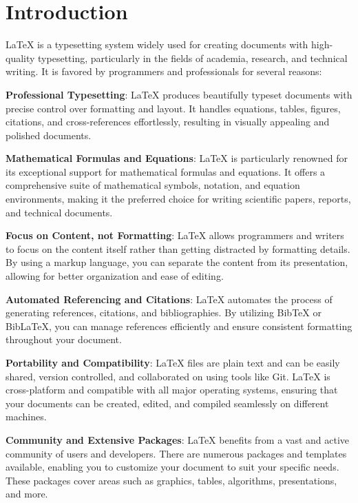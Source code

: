 \documentclass[12pt]{article}
\begin{document}
	
	
	\tableofcontents
	\clearpage
	
	
	\section{Introduction}
	
	LaTeX is a typesetting system widely used for creating documents with high-quality typesetting, particularly in the fields of academia, research, and technical writing. It is favored by programmers and professionals for several reasons:
	
    \textbf{Professional Typesetting}: LaTeX produces beautifully typeset documents with precise control over formatting and layout. It handles equations, tables, figures, citations, and cross-references effortlessly, resulting in visually appealing and polished documents.
	
	\textbf{Mathematical Formulas and Equations}: LaTeX is particularly renowned for its exceptional support for mathematical formulas and equations. It offers a comprehensive suite of mathematical symbols, notation, and equation environments, making it the preferred choice for writing scientific papers, reports, and technical documents.
	
	\textbf{Focus on Content, not Formatting}: LaTeX allows programmers and writers to focus on the content itself rather than getting distracted by formatting details. By using a markup language, you can separate the content from its presentation, allowing for better organization and ease of editing.
	
	\textbf{Automated Referencing and Citations}: LaTeX automates the process of generating references, citations, and bibliographies. By utilizing BibTeX or BibLaTeX, you can manage references efficiently and ensure consistent formatting throughout your document.
	
	\textbf{Portability and Compatibility}: LaTeX files are plain text and can be easily shared, version controlled, and collaborated on using tools like Git. LaTeX is cross-platform and compatible with all major operating systems, ensuring that your documents can be created, edited, and compiled seamlessly on different machines.
	
	\textbf{Community and Extensive Packages}: LaTeX benefits from a vast and active community of users and developers. There are numerous packages and templates available, enabling you to customize your document to suit your specific needs. These packages cover areas such as graphics, tables, algorithms, presentations, and more.
	
\end{document}
